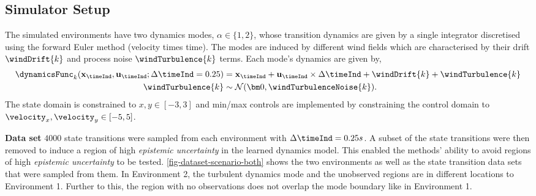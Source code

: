 \documentclass{mimosis-class/mimosis}
\numberwithin{equation}{chapter}
\newcommand{\modeInd}{\ensuremath{k}}
\newcommand{\mode}[1]{\ensuremath{#1_{\modeInd}}}
\newcommand{\state}{\ensuremath{\mathbf{x}}}
\newcommand{\control}{\ensuremath{\mathbf{u}}}
\newcommand{\modeVar}{\ensuremath{\alpha}}
\begin{document}
{\subsection{Simulator Setup}
\label{sec:org01bd279}
The simulated environments have two dynamics modes, \(\modeVar \in \{1, 2\}\), whose
transition dynamics are given by a single integrator discretised using the forward Euler method
(velocity times time).
The modes are induced by different wind fields which are characterised by their
drift \(\windDrift{\modeInd}\) and process noise \(\windTurbulence{\modeInd}\) terms.
Each mode's dynamics are given by,
\begin{align}
\mode{\dynamicsFunc}(\state_\timeInd, \control_\timeInd; \Delta\timeInd=0.25)
&= \state_{\timeInd} + \control_{\timeInd} \times \Delta\timeInd + \windDrift{\modeInd} + \windTurbulence{\modeInd} \\
\windTurbulence{\modeInd} &\sim \mathcal{N}(\bm0, \windTurbulenceNoise{\modeInd}).
\end{align}
The state domain is constrained to \(x, y \in [-3, 3]\) and min/max controls are implemented by constraining the
control domain to \(\velocity_x, \velocity_y \in [-5, 5]\).


\textbf{Data set} \(4000\) state transitions were sampled from each environment with \(\Delta \timeInd = 0.25s\).
A subset of the state transitions were then removed to induce a region of high \emph{epistemic uncertainty} in the
learned dynamics model.
This enabled the methods' ability to avoid regions of high \emph{epistemic uncertainty} to be tested.
\cref{fig-dataset-scenario-both} shows the two environments as well as the state transition data sets that were
sampled from them.
In Environment 2, the turbulent dynamics mode and the unobserved regions are in different locations to
Environment 1.
Further to this, the region with no observations does not overlap the mode boundary like in Environment 1.

}
\end{document}
